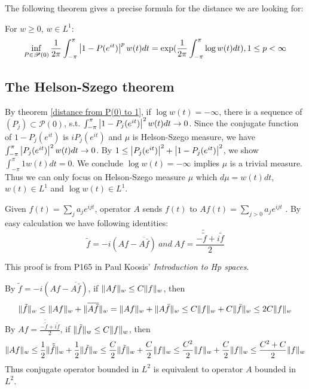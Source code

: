 The following theorem gives a precise formula for the distance we are looking for:
\begin{theorem}\label{distance from P(0) to 1}
    For $w\geq 0$, $w\in L^1$:
    \begin{equation*}
        \inf_{P\in\mathscr{P}(0)}\frac{1}{2\pi}\int_{-\pi}^{\pi}\left\lvert1-P(e^{it})\right\rvert^p w(t)d t=\exp(\frac{1}{2\pi}\int_{-\pi}^{\pi}\log w(t)d t),1\leq p<\infty
    \end{equation*}
\end{theorem}
\subsection{The Helson-Szego theorem}

By theorem \ref{distance from P(0) to 1}, if $\log w(t)=-\infty$,  there is a sequence of $(P_j)\subset\mathscr{P}(0)$, s.t. $\int_{-\pi}^{\pi}\left\lvert1-P_j(e^{it})\right\rvert^2 w(t)d t\to 0$. Since the conjugate function of $1-P_j(e^{it})$ is $iP_j(e^{it})$ and $\mu$ is
Helson-Szego measure, we have $\int_{-\pi}^{\pi}\left\lvert P_j(e^{it})\right\rvert^2 w(t)d t\to 0$. By $1\leq\left\lvert P_j(e^{it})\right\rvert^2+\left\lvert1-P_j(e^{it})\right\rvert^2$, we show $\int_{-\pi}^{\pi}1 w(t)d t= 0$. We conclude $\log w(t)=-\infty$ implies $\mu$ is a trivial measure. Thus we can only
focus on Helson-Szego measure $\mu$ which $d\mu=w(t)dt$, $w(t)\in L^1$ and $\log w(t)\in L^1$.\par
Given $f(t)=\sum_j{a_je^{ijt}}$, operator $A$ sends $f(t)$ to $Af(t)=\sum_{j>0}{a_je^{ijt}}$   . By easy calculation we have following identities:
\begin{equation*}
    \tilde{f}=-i(A f-\overline{A\bar{f}})~and~A f=\frac{-\tilde{\tilde{f}}+i\tilde{f}}{2}
\end{equation*}
\begin{remark}

    This proof is from P165 in  Paul Koosis' \emph{Introduction to Hp spaces}.\par
    By $\tilde{f}=-i(Af-\overline{A\bar{f}})$, if $\lVert Af\rVert_w\leq C\lVert f\rVert_w$, then
    \begin{equation*}
        \lVert\tilde{f}\rVert_w\leq \lVert Af\rVert_w+\lVert\overline{A\bar{f}}\rVert_w=\lVert Af\rVert_w+\lVert{A\bar{f}}\rVert_w\leq C\lVert f\rVert_w+C\lVert{\bar{f}}\rVert_w\leq 2C\lVert f\rVert_w
    \end{equation*}
    By $Af=\frac{-\tilde{\tilde{f}}+i\tilde{f}}{2}$, if $\lVert\tilde{f}\rVert_w\leq C\lVert f\rVert_w$, then
    \begin{equation*}
        \lVert Af\rVert_w\leq \frac{1}{2}\lVert\tilde{\tilde{f}}\rVert_w+\frac{1}{2}\lVert\tilde{f}\rVert_w\leq \frac{C}{2}\lVert{\tilde{f}}\rVert_w+\frac{C}{2}\lVert{f}\rVert_w\leq \frac{C^2}{2}\lVert f\rVert_w+\frac{C}{2}\lVert f\rVert_w\leq \frac{C^2+C}{2}\lVert{f}\rVert_w
    \end{equation*}
    Thus conjugate operator bounded in $L^2$ is equivalent to operator $A$ bounded in $L^2$.
\end{remark}
